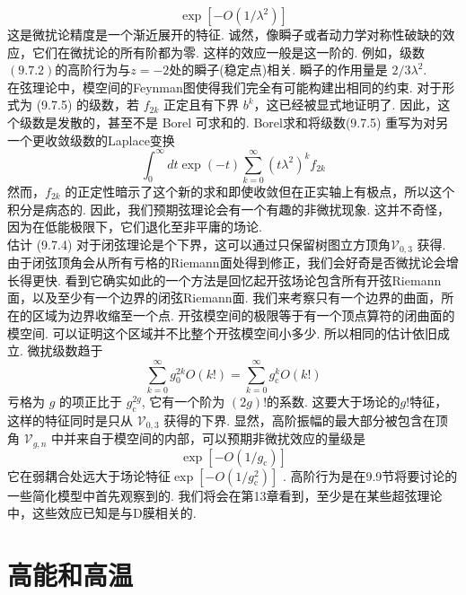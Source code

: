 \begin{equation}
	\exp \left[-O\left(1 / \lambda^{2}\right)\right]
\end{equation}
这是微扰论精度是一个渐近展开的特征. 诚然，像瞬子或者动力学对称性破缺的效应，它们在微扰论的所有阶都为零. 这样的效应一般是这一阶的. 例如，级数 $(9.7 .2)$的高阶行为与$z=-2$处的瞬子(稳定点)相关. 瞬子的作用量是 $2 / 3 \lambda^{2}$.\\
在弦理论中，模空间的Feynman图使得我们完全有可能构建出相同的约束. 对于形式为 (9.7.5) 的级数，若 $f_{2 k}$ 正定且有下界 $b^{k}$，这已经被显式地证明了. 因此，这个级数是发散的，甚至不是 Borel 可求和的. Borel求和将级数(9.7.5) 重写为对另一个更收敛级数的Laplace变换
\begin{equation}
	\int_{0}^{\infty} d t \exp (-t) \sum_{k=0}^{\infty}\left(t \lambda^{2}\right)^{k} f_{2 k}
\end{equation}
然而，$f_{2 k}$ 的正定性暗示了这个新的求和即使收敛但在正实轴上有极点，所以这个积分是病态的. 因此，我们预期弦理论会有一个有趣的非微扰现象. 这并不奇怪，因为在低能极限下，它们退化至非平庸的场论.\\
估计 (9.7.4) 对于闭弦理论是个下界，这可以通过只保留树图立方顶角$\mathscr{V}_{0,3} $ 获得. 由于闭弦顶角会从所有亏格的Riemann面处得到修正，我们会好奇是否微扰论会增长得更快. 看到它确实如此的一个方法是回忆起开弦场论包含所有开弦Riemann面，以及至少有一个边界的闭弦Riemann面. 我们来考察只有一个边界的曲面，所在的区域为边界收缩至一个点. 开弦模空间的极限等于有一个顶点算符的闭曲面的模空间. 可以证明这个区域并不比整个开弦模空间小多少. 所以相同的估计依旧成立. 微扰级数趋于
\begin{equation}
	\sum_{k=0}^{\infty} g_{0}^{2 k} O(k !)=\sum_{k=0}^{\infty} g_{\mathrm{c}}^{k} O(k !)
\end{equation}
亏格为 $g$ 的项正比于 $g_{\mathrm{c}}^{2 g}$, 它有一个阶为 $(2 g) ! $的系数.  这要大于场论的$g !$特征，这样的特征同时是只从 $\mathscr{V}_{0,3}$ 获得的下界. 显然，高阶振幅的最大部分被包含在顶角 $\mathscr{V}_{g, n}$ 中并来自于模空间的内部，可以预期非微扰效应的量级是
\begin{equation}
	\exp \left[-O\left(1 / g_{\mathrm{c}}\right)\right]
\end{equation}
它在弱耦合处远大于场论特征$\exp \left[-O\left(1 / g_{\mathrm{c}}^{2}\right)\right]$ . 高阶行为是在9.9节将要讨论的一些简化模型中首先观察到的. 我们将会在第13章看到，至少是在某些超弦理论中，这些效应已知是与D膜相关的.


\section{高能和高温}%

